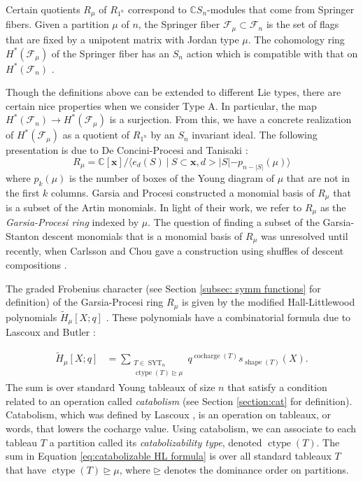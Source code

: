 \documentclass[10pt]{amsart}
\theoremstyle{plain}
\theoremstyle{definition}
\theoremstyle{plain}
\theoremstyle{plain}
\theoremstyle{remark}
\theoremstyle{plain}
\theoremstyle{plain}
\DeclareMathOperator{\cocharge}{cocharge}
\DeclareMathOperator{\syt}{SYT}
\DeclareMathOperator{\ctype}{ctype}
\DeclareMathOperator{\shape}{shape}
\newcommand{\mHL}{\tilde{H}}
\begin{document}
Certain quotients $R_\mu$ of $R_{1^n}$ correspond to $\mathbb{C}S_n$-modules that come from Springer fibers. 
Given a partition $\mu$ of $n$, the Springer fiber $\mathcal{F}_\mu\subset \mathcal{F}_n$  is the set of flags that are fixed by a unipotent matrix with Jordan type $\mu$. The cohomology ring $H^{*}(\mathcal{F}_\mu)$ of the Springer fiber has an $S_n$ action which is compatible with that on $H^{*}(\mathcal{F}_n)$ \cite{Springer1978}. 

Though the definitions above can be extended to different Lie types, there are certain nice properties when we consider Type A. In particular, the map $H^*(\mathcal{F}_n) \to H^*(\mathcal{F}_\mu)$ is a surjection. 
From this, we have a concrete realization of $H^*(\mathcal{F}_\mu)$ as a quotient of $R_{1^n}$ by an $S_n$ invariant ideal. The following presentation is due to De Concini-Procesi \cite{deCon-Proc} and Tanisaki \cite{Tanisaki}:
\[R_\mu = \mathbb{C}[\mathbf{x}]/\langle e_d(S) \ | \ S\subset \mathbf{x}, d> |S| -p_{n-|S|}(\mu) \rangle\]
where $p_{k}(\mu)$ is the number of boxes of the Young diagram of $\mu$ that are not in the first $k$ columns.
Garsia and Procesi \cite{GP} constructed a monomial basis of $R_\mu$ that is a subset of the Artin monomials.
In light of their work, we refer to $R_\mu$ as the \textit{Garsia-Procesi ring} indexed by $\mu$. 
The question of finding a subset of the Garsia-Stanton descent monomials that is a monomial basis of $R_\mu$ was unresolved until recently, when Carlsson and Chou gave a construction using shuffles of descent compositions  \cite{CC}. 

The graded Frobenius character (see Section \ref{subsec: symm functions} for definition) of the Garsia-Procesi ring $R_\mu$ is given by the modified Hall-Littlewood polynomials 
$\tilde{H}_\mu[X;q]$ \cite{HottaSpringer}. These polynomials have a combinatorial formula due to  
Lascoux \cite{Lascoux} and Butler \cite{butler}:

\begin{align}\label{eq:catabolizable HL formula}
        \mHL_\mu[X;q] &=  \sum\limits_{\substack{T\in \syt_n\\  \ctype(T)\unrhd\mu}}  q^{\cocharge(T)} s_{\shape(T)}(X).
\end{align}
The sum is over standard Young tableaux of size $n$ that satisfy a condition related to an operation called \textit{catabolism} (see Section \ref{section:cat} for definition). Catabolism, which was defined by Lascoux \cite{Lascoux},  is an operation on tableaux, or words, that lowers the cocharge value. 
Using catabolism, we can associate to each tableau $T$ a partition called its \textit{catabolizability type}, denoted $\ctype(T)$.
The sum in Equation \eqref{eq:catabolizable HL formula} is over all standard tableaux $T$ that have $\ctype(T) \unrhd \mu$, where $\unrhd$ denotes the dominance order on partitions.
\end{document}
